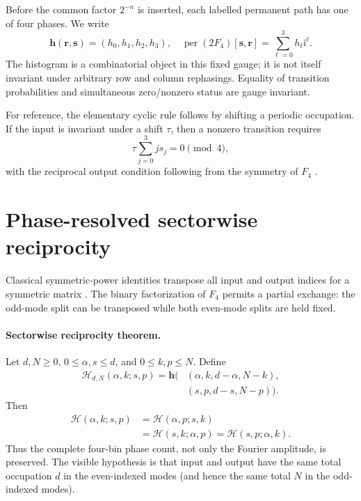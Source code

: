 \documentclass[aps,pra,reprint,amsmath,amssymb,superscriptaddress,longbibliography]{revtex4-2}
\newcommand{\Ffour}{F_{4}}
\newcommand{\ii}{\mathrm{i}}
\newcommand{\per}{\operatorname{per}}
\begin{document}
Before the common factor $2^{-n}$ is inserted, each labelled permanent path
has one of four phases.  We write
\begin{equation}
\bm h(\bm r,\bm s)=(h_0,h_1,h_2,h_3),
\quad
\per (2\Ffour)[\bm s,\bm r]
=\sum_{\ell=0}^{3}h_\ell\ii^\ell .
\label{eq:hist}
\end{equation}
The histogram is a combinatorial object in this fixed gauge; it is not itself
invariant under arbitrary row and column rephasings.  Equality of transition
probabilities and simultaneous zero/nonzero status are gauge invariant.

For reference, the elementary cyclic rule follows by shifting a periodic
occupation.  If the input is invariant under a shift $\tau$, then a nonzero
transition requires
\begin{equation}
\tau\sum_{j=0}^{3}j s_j=0\pmod 4 ,
\label{eq:cyclic}
\end{equation}
with the reciprocal output condition following from the symmetry of
$\Ffour$ \cite{Tichy2010,Dittel2018PRA}.

\section{Phase-resolved sectorwise reciprocity}
\label{sec:reciprocity}

Classical symmetric-power identities transpose all input and output indices
for a symmetric matrix \cite{ChenLouck1998,Chami2014}.  The binary
factorization of $\Ffour$ permits a partial exchange: the odd-mode split can
be transposed while both even-mode splits are held fixed.

\paragraph*{Sectorwise reciprocity theorem.}
Let $d,N\geq0$, $0\leq\alpha,s\leq d$, and $0\leq k,p\leq N$.  Define
\begin{align}
\mathcal H_{d,N}(\alpha,k;s,p)
=\bm h\big(&(\alpha,k,d-\alpha,N-k),\nonumber\\
           &(s,p,d-s,N-p)\big).
\end{align}
Then
\begin{align}
\mathcal H(\alpha,k;s,p)
&=\mathcal H(\alpha,p;s,k)\nonumber\\
&=\mathcal H(s,k;\alpha,p)
=\mathcal H(s,p;\alpha,k).
\label{eq:fourfold}
\end{align}
Thus the complete four-bin phase count, not only the Fourier amplitude, is
preserved.  The visible hypothesis is that input and output have the same
total occupation $d$ in the even-indexed modes (and hence the same total
$N$ in the odd-indexed modes).
\end{document}
